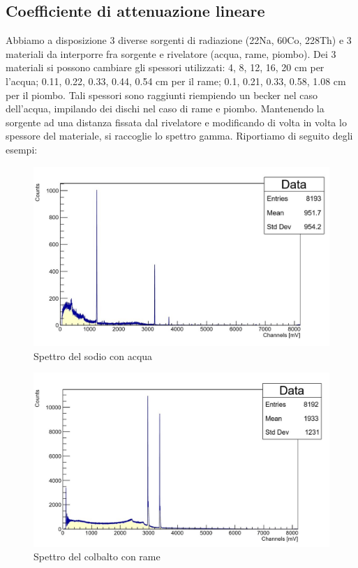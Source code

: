 \documentclass[a4paper,10pt]{article}
\begin{document}
\subsection{Coefficiente di attenuazione lineare}
\noindent Abbiamo a disposizione 3 diverse sorgenti di radiazione (22Na, 60Co, 228Th) e 3 materiali da interporre fra sorgente e rivelatore (acqua, rame, piombo). Dei 3 materiali si possono cambiare gli spessori utilizzati: 4, 8, 12, 16, 20 cm per l'acqua; 0.11, 0.22, 0.33, 0.44, 0.54 cm per il rame; 0.1, 0.21, 0.33, 0.58, 1.08 cm per il piombo. Tali spessori sono raggiunti riempiendo un becker nel caso dell'acqua, impilando dei dischi nel caso di rame e piombo. Mantenendo la sorgente ad una distanza fissata dal rivelatore e modificando di volta in volta lo spessore del materiale, si raccoglie lo spettro gamma. Riportiamo di seguito degli esempi:

\begin{figure}[!h]
    \centering
    \includegraphics[scale=0.6]{grafici/sodioacqua}
    \caption{Spettro del sodio con acqua}
\end{figure}

\begin{figure}[!h]
    \centering
    \includegraphics[scale=0.6]{grafici/cobaltorame}
    \caption{Spettro del colbalto con rame}
\end{figure}
\end{document}
